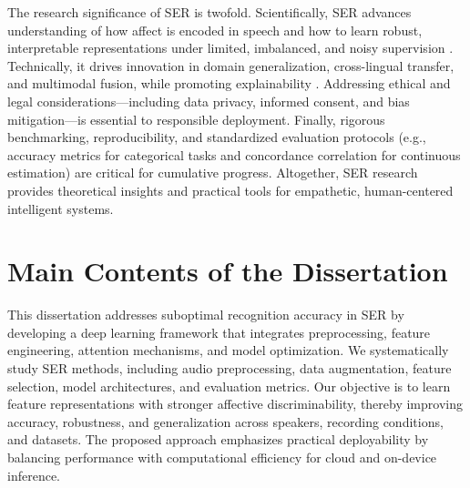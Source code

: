 The research significance of SER is twofold. Scientifically, SER advances understanding of how affect is encoded in speech and how to learn robust, interpretable representations under limited, imbalanced, and noisy supervision \cite{latif2021survey,lee2021deep}. Technically, it drives innovation in domain generalization, cross-lingual transfer, and multimodal fusion, while promoting explainability \cite{al2024challenges}. Addressing ethical and legal considerations—including data privacy, informed consent, and bias mitigation—is essential to responsible deployment. Finally, rigorous benchmarking, reproducibility, and standardized evaluation protocols (e.g., accuracy metrics for categorical tasks and concordance correlation for continuous estimation) are critical for cumulative progress. Altogether, SER research provides theoretical insights and practical tools for empathetic, human-centered intelligent systems.


\section{Main Contents of the Dissertation}
This dissertation addresses suboptimal recognition accuracy in SER by developing a deep learning framework that integrates preprocessing, feature engineering, attention mechanisms, and model optimization. We systematically study SER methods, including audio preprocessing, data augmentation, feature selection, model architectures, and evaluation metrics. Our objective is to learn feature representations with stronger affective discriminability, thereby improving accuracy, robustness, and generalization across speakers, recording conditions, and datasets. The proposed approach emphasizes practical deployability by balancing performance with computational efficiency for cloud and on-device inference.

